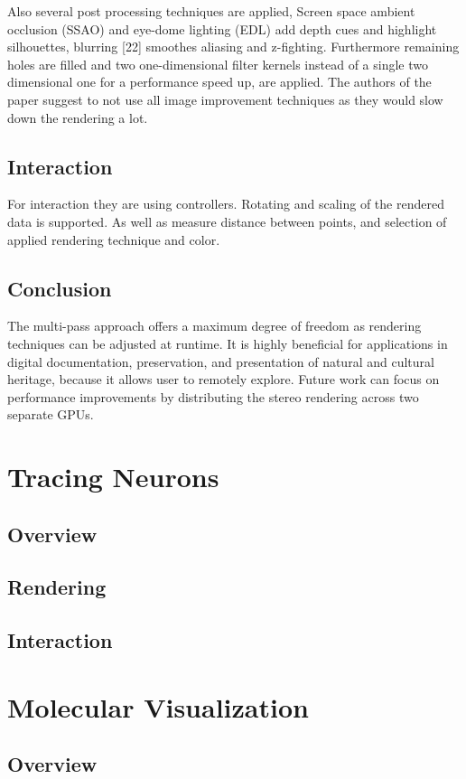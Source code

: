 \documentclass[10pt,twocolumn,letterpaper]{article}
\begin{document}
Also several post processing techniques are applied, Screen space ambient occlusion (SSAO) \cite{mittring2007finding} and eye-dome lighting (EDL) \cite{boucheny2009interactive} add depth cues and highlight silhouettes, blurring [22]
smoothes aliasing and z-fighting. Furthermore remaining holes are filled and two one-dimensional filter kernels \cite{dobrev2010image} instead of a single two dimensional one for a performance speed up, are applied.
The authors of the paper suggest to not use all image improvement techniques as they would slow down the rendering a lot.


\subsection{Interaction}
For interaction they are using controllers. Rotating and scaling of the rendered data is supported. As well as measure distance between points, and selection of applied rendering technique and color.
\subsection{Conclusion}
The multi-pass approach offers a maximum degree of freedom as rendering techniques can be adjusted at runtime. It is highly beneficial for applications in digital documentation, preservation, and presentation of natural and cultural heritage, because it allows user to remotely explore. Future work can focus on performance improvements by distributing the stereo rendering across two separate GPUs.
\section{Tracing Neurons}
\subsection{Overview}
\subsection{Rendering}
\subsection{Interaction}

\section{Molecular Visualization}
\subsection{Overview}
\end{document}
